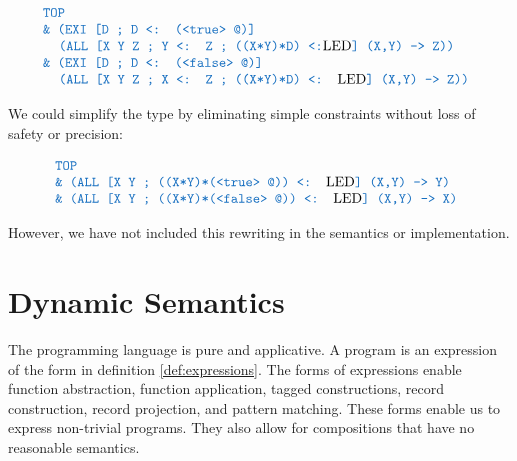 \documentclass[acmsmall]{acmart}
\theoremstyle{definition}
\begin{document}
\[
  \begin{array}[t]{@{} l}
    \obj{TOP}
    \\
    \obj{\& (EXI [D ; D <: (<true> @)]}
    \\
    \I \obj{(ALL [X Y Z ; Y <: Z ; ((X*Y)*D) <:}\text{LED}\obj{] (X,Y) -> Z))}
    \\
    \obj{\& (EXI [D ; D <: (<false> @)]}
    \\
    \I \obj{(ALL [X Y Z ; X <: Z ; ((X*Y)*D) <: }\text{LED}\obj{] (X,Y) -> Z))}
  \end{array}
\]

We could simplify the type by eliminating simple constraints without loss of safety or precision:

\[
  \begin{array}[t]{@{} l}
    \obj{TOP}
    \\
    \obj{\& (ALL [X Y ; ((X*Y)*(<true> @)) <: }\text{LED}\obj{] (X,Y) -> Y)}
    \\
    \obj{\& (ALL [X Y ; ((X*Y)*(<false> @)) <: }\text{LED}\obj{] (X,Y) -> X)}
  \end{array}
\]

However, we have not included this rewriting in the semantics or implementation. 





\section{Dynamic Semantics}
The programming language is pure and applicative. A program is an expression 
of the form in definition \ref{def:expressions}. The forms of expressions
enable function abstraction, function application, tagged constructions, record construction, record projection,
and pattern matching. These forms enable us to express non-trivial programs. They also allow
for compositions that have no reasonable semantics.  
\end{document}
